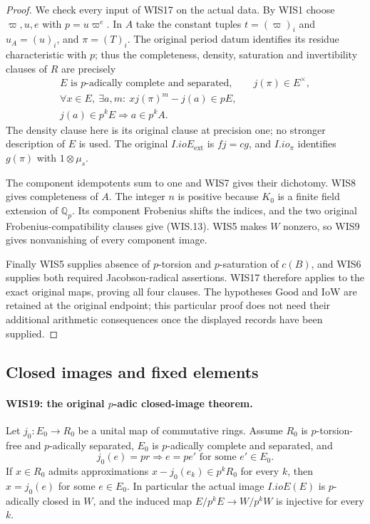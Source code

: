 \documentclass[11pt,a4paper]{article}
\numberwithin{equation}{section}
\theoremstyle{remark}\newtheorem{remark}[theorem]{Remark}
\begin{document}
\begin{proof}
We check every input of WIS17 on the actual data.
By WIS1 choose $\varpi,u,e$ with $p=u\varpi^e$.
In $A$ take the constant tuples $t=(\varpi)_i$ and
$u_A=(u)_i$, and $\pi=(T)_i$.
The original period datum identifies its residue
characteristic with $p$; thus the completeness,
density, saturation and invertibility clauses of
$R$ are precisely
\[
 \begin{gathered}
 E\text{ is }p\text{-adically complete and separated},
 \qquad j(\pi)\in E^\times,\\
 \forall x\in E,\ \exists a,m:\ xj(\pi)^m-j(a)\in pE,\\
 j(a)\in p^kE\Longrightarrow a\in p^kA .
 \end{gathered}                                            \tag{WIS.28}
\]
The density clause here is its original clause at
precision one; no stronger description of $E$ is used.
The original $I.ioE_{\mathrm{ext}}$ is $fj=cg$, and
$I.io_\pi$ identifies $g(\pi)$ with $1\otimes\mu_s$.

The component idempotents sum to one and WIS7 gives
their dichotomy. WIS8 gives completeness of $A$.
The integer $n$ is positive because $K_0$ is a finite
field extension of $\mathbb Q_p$. Its component
Frobenius shifts the indices, and the two original
Frobenius-compatibility clauses give (WIS.13).
WIS5 makes $W$ nonzero, so WIS9 gives nonvanishing
of every component image.

Finally WIS5 supplies absence of $p$-torsion and
$p$-saturation of $c(B)$, and WIS6 supplies both
required Jacobson-radical assertions. WIS17 therefore
applies to the exact original maps, proving all four
clauses. The hypotheses $\mathrm{Good}$ and
$\mathrm{IoW}$ are retained at the original endpoint;
this particular proof does not need their additional
arithmetic consequences once the displayed records
have been supplied.
\end{proof}

\subsection{Closed images and fixed elements}

\paragraph{WIS19: the original $p$-adic closed-image theorem.}
\label{claim:WIS19}
Let $j_0:E_0\to R_0$ be a unital map of commutative rings.
Assume $R_0$ is $p$-torsion-free and $p$-adically separated,
$E_0$ is $p$-adically complete and separated, and
\[
 j_0(e)=pr\Longrightarrow e=pe'
                              \text{ for some }e'\in E_0. \tag{WIS.29}
\]
If $x\in R_0$ admits approximations
$x-j_0(e_k)\in p^kR_0$ for every $k$, then
$x=j_0(e)$ for some $e\in E_0$.
In particular the actual image $I.ioE(E)$ is $p$-adically
closed in $W$, and the induced map
$E/p^kE\to W/p^kW$ is injective for every $k$.
\end{document}
